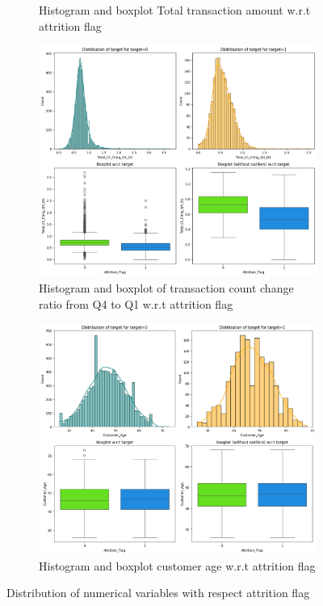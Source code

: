 \documentclass[10pt,a4paper]{style}
\begin{document}
\begin{figure}[h]
\begin{subfigure}[t]{0.47\linewidth}
			\caption{Histogram and boxplot Total transaction amount w.r.t attrition flag}
			\label{fig:Total_Trans_Amt vs Attrition_Flag}
		\end{subfigure}
		\hfill
		\begin{subfigure}[t]{0.47\linewidth}
			\centering
			\includegraphics[width=\linewidth]{Total_Ct_Chng_Q4_Q1 vs Attrition_Flag.png}
			\caption{Histogram and boxplot of transaction count change ratio from Q4 to Q1 w.r.t attrition flag}
			\label{fig:Total_Ct_Chng_Q4_Q1 vs Attrition_Flag}
		\end{subfigure}
		\hfill
		\begin{subfigure}[t]{0.47\linewidth}
			\centering
			\includegraphics[width=\linewidth]{Attrition_Flag vs Customer_Age.png}
			\caption{Histogram and boxplot customer age w.r.t attrition flag}
			\label{fig:Attrition_Flag vs Customer_Age}
		\end{subfigure}
		\caption{Distribution of numerical variables with respect attrition flag}
		\label{fig: Distribution of numerical variables with respect attrition flag}
	\end{figure}
	
\end{document}
